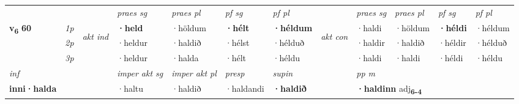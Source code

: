 \begin{longtable}[l]{X>{\footnotesize\itshape}llXXXXlXXXX}
 & &   & \textit{praes sg}  & \textit{praes pl}    & \textit{ pf sg} & \textit{pf pl} & & \textit{praes sg}  & \textit{praes pl}    & \textit{pf sg} & \textit{pf pl }  \\ \cmidrule{4-7} \cmidrule{9-12}
 \multirow{2}{*}{{{\textbf{v{\textsubscript{6}}} \Large{\textbf{60}}}}}  & 1p & \multirow{3}{*}{\begin{turn}{90}\textit{akt ind}\end{turn}} & \textbf{·held} & ·höldum & \textbf{·hélt} & \textbf{·héldum} & \multirow{3}{*}{\begin{turn}{90}\textit{akt con}\end{turn}} &·haldi & ·höldum & \textbf{·héldi} & ·héldum\\*
 & 2p &  &  ·heldur  & ·haldið & ·hélst & ·hélduð & & ·haldir & ·haldið & ·héldir & ·hélduð \\*
 & 3p &  & ·heldur & ·halda & ·hélt & ·héldu & & ·haldi & ·haldi& ·héldi & ·héldu \\*
\cmidrule{4-7} \cmidrule{9-12}

   {\textit{inf}} & &  & \textit{imper akt sg} & \textit{imper akt pl}   & \textit{presp} & \textit{supin}  && \textit{pp m} \\*
  {\textbf{inni\allowbreak ·halda}} & && ·haltu  & ·haldið   & ·haldandi &  \textbf{·haldið}  && \multicolumn{2}{l}{\textbf{·haldinn} adj\textbf{\textsubscript{6-4}}} \\*


\end{longtable}
